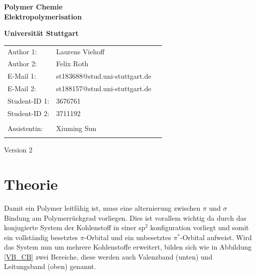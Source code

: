 \documentclass[10pt,a4paper,ngerman]{scrartcl}
\begin{document}
\begin{titlepage}
	\vspace*{2,5cm}
	\begin{center}
		\begin{LARGE}
			\textbf{Polymer Chemie}\\
			\textbf{Elektropolymerisation}\\
		\end{LARGE}
		\vspace{1cm}
		\textbf{Universität Stuttgart}\\
		\vspace*{1,5cm}
		\begin{tabular}{lp{}l}
			Author 1:     &Laurens Viehoff\\
            Author 2:     &Felix Roth\\   
			E-Mail 1:      &st183688@stud.uni-stuttgart.de\\
            E-Mail 2:      &st188157@stud.uni-stuttgart.de  \\
			Student-ID 1: & 3676761   \\ 
            Student-ID 2: & 3711192 \\ \\
			Assistentin:  & Xiuming Sun  \\ \\ 
		\end{tabular}
		
		\vspace{2cm}
		Version 2\\
	\end{center}

    
\end{titlepage}
\thispagestyle{empty}
\renewcommand{\thepage}{\arabic{page}}
\newpage
\tableofcontents
\setcounter{page}{1}
\renewcommand{\thepage}{\arabic{page}}
\newpage

\section{Theorie}

	Damit ein Polymer leitfähig ist, muss eine alternierung zwischen $\pi$ und $\sigma$ Bindung am Polymerrückgrad vorliegen.
	Dies ist vorallem wichtig da durch das konjugierte System der Kohlenstoff in einer sp$^2$ konfiguration vorliegt 
	und somit ein vollständig besetztes $\pi$-Orbital und ein unbesetztes $\pi^*$-Orbital aufweist. 
	Wird das System nun um mehrere Kohlenstoffe erweitert, bilden sich wie in Abbildung \ref{VB_CB} zwei Bereiche, diese werden auch Valenzband (unten) 
	und Leitungsband (oben) genannt.
	
\end{document}
